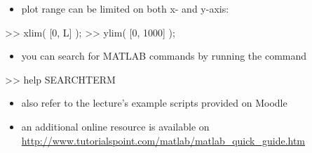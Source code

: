 \begin{itemize}
	\item plot range can be limited on both x- and y-axis:
\end{itemize}
\begin{code}
>> xlim( [0, L] ); \color{medium}%
>> ylim( [0, 1000] ); \color{medium}%
\end{code}
\begin{itemize}
	\item you can search for MATLAB commands by running the command
\end{itemize}
\begin{code}
>> help SEARCHTERM
\end{code}
\begin{itemize}
	\item also refer to the lecture's example scripts provided on Moodle
	\item an additional online resource is available on \url{http://www.tutorialspoint.com/matlab/matlab_quick_guide.htm}
\end{itemize}

